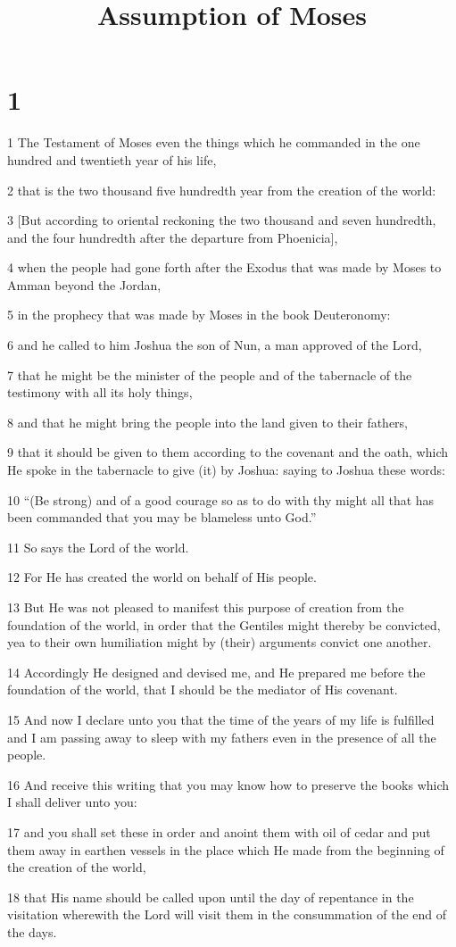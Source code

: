 

\title{Assumption of Moses}

\chapter{1}

\par 1 The Testament of Moses even the things which he commanded in the one hundred and twentieth year of his life,
\par 2 that is the two thousand five hundredth year from the creation of the world:
\par 3 [But according to oriental reckoning the two thousand and seven hundredth, and the four hundredth after the departure from Phoenicia],
\par 4 when the people had gone forth after the Exodus that was made by Moses to Amman beyond the Jordan,
\par 5 in the prophecy that was made by Moses in the book Deuteronomy:
\par 6 and he called to him Joshua the son of Nun, a man approved of the Lord,
\par 7 that he might be the minister of the people and of the tabernacle of the testimony with all its holy things,
\par 8 and that he might bring the people into the land given to their fathers,
\par 9 that it should be given to them according to the covenant and the oath, which He spoke in the tabernacle to give (it) by Joshua: saying to Joshua these words:
\par 10 “(Be strong) and of a good courage so as to do with thy might all that has been commanded that you may be blameless unto God.”
\par 11 So says the Lord of the world.
\par 12 For He has created the world on behalf of His people.
\par 13 But He was not pleased to manifest this purpose of creation from the foundation of the world, in order that the Gentiles might thereby be convicted, yea to their own humiliation might by (their) arguments convict one another.
\par 14 Accordingly He designed and devised me, and He prepared me before the foundation of the world, that I should be the mediator of His covenant.
\par 15 And now I declare unto you that the time of the years of my life is fulfilled and I am passing away to sleep with my fathers even in the presence of all the people.
\par 16 And receive this writing that you may know how to preserve the books which I shall deliver unto you:
\par 17 and you shall set these in order and anoint them with oil of cedar and put them away in earthen vessels in the place which He made from the beginning of the creation of the world,
\par 18 that His name should be called upon until the day of repentance in the visitation wherewith the Lord will visit them in the consummation of the end of the days.

